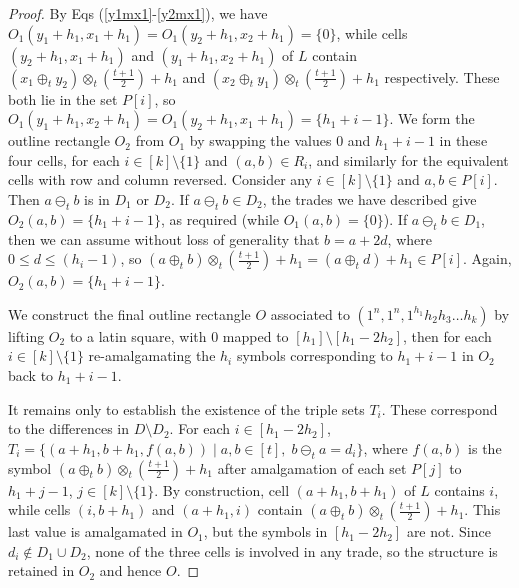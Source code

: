 \documentclass{sn-jnl}
\theoremstyle{definition}
\begin{document}
\begin{proof}
By Eqs (\ref{y1mx1}-\ref{y2mx1}), we have $O_1(y_1+h_1,x_1+h_1)=O_1(y_2+h_1,x_2+h_1)=\{0\}$, while cells $(y_2+h_1,x_1+h_1)$ and $(y_1+h_1,x_2+h_1)$ of $L$ contain $(x_1 \oplus_t y_2) \otimes_t \left(\frac{t+1}{2}\right)+h_1$ and $(x_2 \oplus_t y_1) \otimes_t \left(\frac{t+1}{2}\right)+h_1$ respectively. These both lie in the set $P[i]$, so $O_1(y_1+h_1,x_2+h_1)=O_1(y_2+h_1,x_1+h_1)=\{h_1+i-1\}$. 
We form the outline rectangle $O_2$ from $O_1$ by swapping the values 0 and $h_1+i-1$ in these four cells, for each $i \in [k]\setminus\{1\}$ and $(a,b)\in R_i$, and similarly for the equivalent cells with row and column reversed. Consider any $i \in [k]\setminus\{1\}$ and  $a,b \in P[i]$. Then $a \ominus_t b$ is in $D_1$ or $D_2$. If $a \ominus_t b \in D_2$, the trades we have described give $O_2(a,b) = \{h_1+i-1\}$, as required (while $O_1(a,b) = \{0\}$). If $a \ominus_t b \in D_1$, then we can assume without loss of generality that $b=a+2d$, where $0\le d\le (h_i-1)$, so $(a \oplus_t b) \otimes_t \left(\frac{t+1}{2}\right)+h_1 = (a \oplus_t d) + h_1 \in P[i]$. Again, $O_2(a,b)=\{h_1+i-1\}$.

We construct the final outline rectangle $O$ associated to $(1^n,1^n,1^{h_1}h_2h_3\dots h_k)$ by lifting $O_2$ to a latin square, with 0 mapped to $[h_1]\setminus [h_1-2h_2]$, then for each $i\in [k] \setminus \{1\}$ re-amalgamating the $h_i$ symbols corresponding to $h_1+i-1$ in $O_2$ back to $h_1+i-1$.

It remains only to establish the existence of the triple sets $T_i$. These correspond to the differences in $D \setminus D_2$.
For each $i\in [h_1-2h_2]$, $T_i = \{(a+h_1,b+h_1,f(a,b)) \mid a,b \in [t],\; b\ominus_t a = d_i\}$, where $f(a,b)$ is the symbol $(a \oplus_t b) \otimes_t \left(\frac{t+1}{2}\right)+h_1$ after amalgamation of each set $P[j]$ to $h_1+j-1$, $j\in [k]\setminus\{1\}$. By construction, cell $(a+h_1,b+h_1)$ of $L$ contains $i$, while cells $(i,b+h_1)$ and $(a+h_1,i)$ contain $(a \oplus_t b) \otimes_t \left(\frac{t+1}{2}\right)+h_1$. This last value is amalgamated in $O_1$, but the symbols in $[h_1-2h_2]$ are not. Since $d_i \not\in D_1 \cup D_2$, none of the three cells is involved in any trade, so the structure is retained in $O_2$ and hence $O$.

\end{proof}
\end{document}
